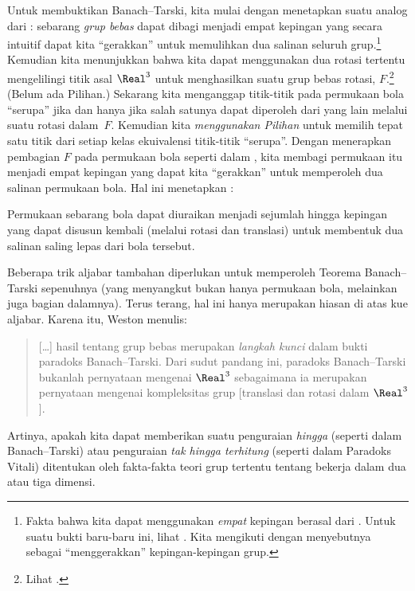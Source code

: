 \documentclass[../../../include/open-logic-section]{subfiles}
\begin{document}
Untuk membuktikan Banach--Tarski, kita mulai dengan menetapkan suatu analog
dari : sebarang \emph{grup bebas} dapat dibagi menjadi
empat kepingan yang secara intuitif dapat kita ``gerakkan'' untuk
memulihkan dua salinan seluruh grup.\footnote{Fakta bahwa kita dapat
menggunakan \emph{empat} kepingan berasal dari \cite{Robinson1947}. Untuk
suatu bukti baru-baru ini, lihat \citet[Teorema 5.2]{Wagon2016}. Kita
mengikuti \citet[hlm.~3]{Weston2003} dengan menyebutnya sebagai
``menggerakkan'' kepingan-kepingan grup.} Kemudian kita menunjukkan bahwa
kita dapat menggunakan dua rotasi tertentu mengelilingi titik asal
$\Real^3$ untuk menghasilkan suatu grup bebas rotasi, $F$.\footnote{Lihat
\citet[Teorema 2.1]{Wagon2016}.} (Belum ada Pilihan.) Sekarang kita
menganggap titik-titik pada permukaan bola ``serupa'' jika dan hanya jika
salah satunya dapat diperoleh dari yang lain melalui suatu rotasi dalam~$F$.
Kemudian kita \emph{menggunakan Pilihan} untuk memilih tepat satu titik dari
setiap kelas ekuivalensi titik-titik ``serupa''. Dengan menerapkan
pembagian $F$ pada permukaan bola seperti dalam
, kita membagi permukaan itu menjadi empat
kepingan yang dapat kita ``gerakkan'' untuk memperoleh dua salinan
permukaan bola. Hal ini menetapkan \citep{Hausdorff1914}:

\begin{thm}
Permukaan sebarang bola dapat diuraikan menjadi sejumlah hingga kepingan yang
dapat disusun kembali (melalui rotasi dan translasi) untuk membentuk dua
salinan saling lepas dari bola tersebut.
\end{thm}

Beberapa trik aljabar tambahan diperlukan untuk memperoleh Teorema
Banach--Tarski sepenuhnya (yang menyangkut bukan hanya permukaan bola,
melainkan juga bagian dalamnya). Terus terang, hal ini hanya merupakan
hiasan di atas kue aljabar. Karena itu, Weston menulis:
\begin{quote}
  [\ldots] hasil tentang grup bebas merupakan \emph{langkah kunci} dalam
  bukti paradoks Banach--Tarski. Dari sudut pandang ini, paradoks
  Banach--Tarski bukanlah pernyataan mengenai $\Real^3$ sebagaimana ia
  merupakan pernyataan mengenai kompleksitas grup [translasi dan rotasi
  dalam $\Real^3$]. \cite[hlm.~16]{Weston2003}
\end{quote}
Artinya, apakah kita dapat memberikan suatu penguraian \emph{hingga} (seperti
dalam Banach--Tarski) atau penguraian \emph{tak hingga terhitung} (seperti
dalam Paradoks Vitali) ditentukan oleh fakta-fakta teori grup tertentu
tentang bekerja dalam dua atau tiga dimensi.
\end{document}
